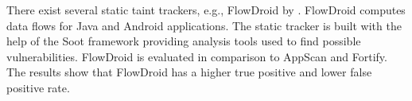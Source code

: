 There exist several static taint trackers, e.g., FlowDroid by \textcite{ArztS.2014FPcf}. FlowDroid computes data flows for Java and Android applications. The static tracker is built with the help of the Soot framework \parencite{soot} providing analysis tools used to find possible vulnerabilities. FlowDroid is evaluated in comparison to AppScan and Fortify. The results show that FlowDroid has a higher true positive and lower false positive rate.